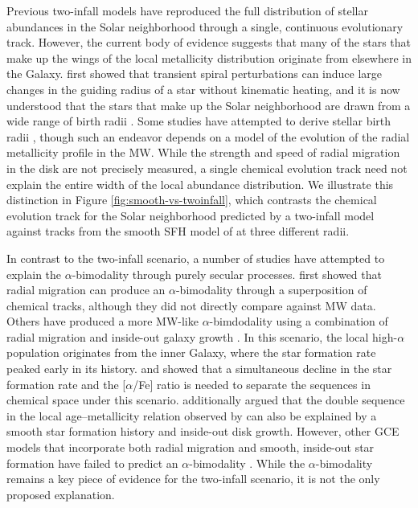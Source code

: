 \documentclass[twocolumn,twocolappendix,linenumbers]{aastex631}
\newcommand{\todo}[1]{{\color{red}#1}}
\newcommand{\aFe}{[$\alpha$/Fe]\xspace}
\begin{document}
Previous two-infall models have reproduced the full distribution of stellar abundances in the Solar neighborhood through a single, continuous evolutionary track. However, the current body of evidence suggests that many of the stars that make up the wings of the local metallicity distribution originate from elsewhere in the Galaxy. \citet{sellwood_radial_2002} first showed that transient spiral perturbations can induce large changes in the guiding radius of a star without kinematic heating, and it is now understood that the stars that make up the Solar neighborhood are drawn from a wide range of birth radii \citep[e.g.,][]{schonrich_chemical_2009,frankel_measuring_2018,lehmann_probing_2024}. Some studies have attempted to derive stellar birth radii \citep[e.g.,][]{ratcliffe_unveiling_2023,lu_there_2024}, though such an endeavor depends on a model of the evolution of the radial metallicity profile in the MW. While the strength and speed of radial migration in the disk are not precisely measured, a single chemical evolution track need not explain the entire width of the local abundance distribution. We illustrate this distinction in Figure \ref{fig:smooth-vs-twoinfall}, which contrasts the chemical evolution track for the Solar neighborhood predicted by a two-infall model against tracks from the smooth SFH model of \citet{johnson_stellar_2021} at three different radii.

In contrast to the two-infall scenario, a number of studies have attempted to explain the $\alpha$-bimodality through purely secular processes. 
\citet{schonrich_chemical_2009} first showed that radial migration can produce an $\alpha$-bimodality through a superposition of chemical tracks, although they did not directly compare against MW data. Others have produced a more MW-like $\alpha$-bimdodality using a combination of radial migration and inside-out galaxy growth \citep[e.g.,][]{kubryk_evolution_2015,sharma_chemical_2021,chen_chemical_2023,prantzos_origin_2023}. In this scenario, the local high-$\alpha$ population originates from the inner Galaxy, where the star formation rate peaked early in its history. \citet{sharma_chemical_2021} and \citet{chen_chemical_2023} showed that a simultaneous decline in the star formation rate and the \aFe ratio is needed to separate the sequences in chemical space under this scenario. \citet{chen_recent_2025} additionally argued that the double sequence in the local age--metallicity relation observed by \citet{nissen_high-precision_2020} can also be explained by a smooth star formation history and inside-out disk growth. However, other GCE models that incorporate both radial migration and smooth, inside-out star formation have failed to predict an $\alpha$-bimodality \citep[e.g.,][]{johnson_stellar_2021,dubay_galactic_2024}. While the $\alpha$-bimodality remains a key piece of evidence for the two-infall scenario, it is not the only proposed explanation.
\end{document}
